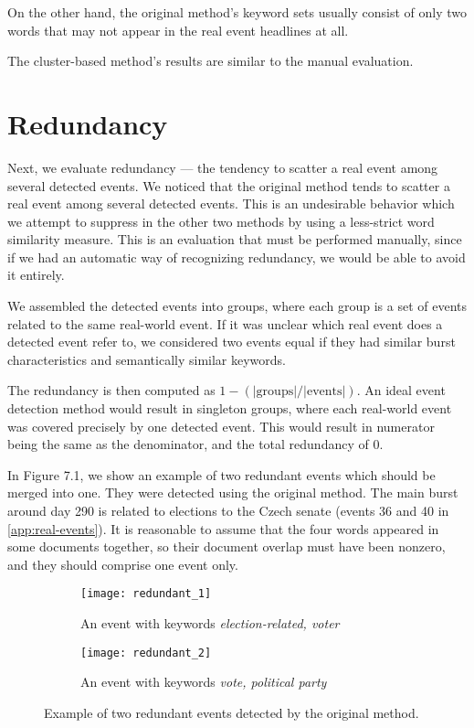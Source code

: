 On the other hand, the original method's keyword sets usually consist of only two words that may not appear in the real event headlines at all.

The cluster-based method's results are similar to the manual evaluation.

\section{Redundancy} \label{sec:redundancy}

Next, we evaluate redundancy --- the tendency to scatter a real event among several detected events. We noticed that the original method tends to scatter a real event among several detected events. This is an undesirable behavior which we attempt to suppress in the other two methods by using a less-strict word similarity measure. This is an evaluation that must be performed manually, since if we had an automatic way of recognizing redundancy, we would be able to avoid it entirely.

We assembled the detected events into groups, where each group is a set of events related to the same real-world event. If it was unclear which real event does a detected event refer to, we considered two events equal if they had similar burst characteristics and semantically similar keywords.

The redundancy is then computed as $1 - (\left| \text{groups} \right| / \left| \text{events} \right|)$. An ideal event detection method would result in singleton groups, where each real-world event was covered precisely by one detected event. This would result in numerator being the same as the denominator, and the total redundancy of 0.

In Figure 7.1, we show an example of two redundant events which should be merged into one. They were detected using the original method. The main burst around day 290 is related to elections to the Czech senate (events 36 and 40 in \autoref{app:real-events}). It is reasonable to assume that the four words appeared in some documents together, so their document overlap must have been nonzero, and they should comprise one event only.

\begin{figure}
\centering
\begin{subfigure}{.5\textwidth}
  \centering
  \texttt{[image: redundant\_1]}  %
  \caption{An event with keywords \textit{election-related, voter}}
  \label{fig:redundant-1}
\end{subfigure}%
\begin{subfigure}{.5\textwidth}
  \centering
  \texttt{[image: redundant\_2]}  %
  \caption{An event with keywords \textit{vote, political party}}
  \label{fig:redundant-2}
\end{subfigure}
\caption{Example of two redundant events detected by the original method.}
\end{figure} \label{fig:redundant-events}


